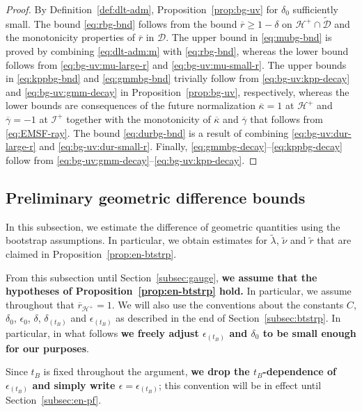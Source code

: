 \documentclass[10pt, reqno]{amsart}
\theoremstyle{definition}
\theoremstyle{remark}
\theoremstyle{conjecture}
\numberwithin{equation}{section}
\newcommand{\0}{\emptyset}
\newcommand{\dlt}{\delta}
\newcommand{\eps}{\epsilon}
\newcommand{\lmb}{\lambda}
\newcommand{\calD}{\mathcal D}
\newcommand{\calH}{\mathcal H}
\newcommand{\calI}{\mathcal I}
\newcommand{\dur}{\nu}
\newcommand{\dvr}{\lmb}
\newcommand{\de}{\delta}
\newcommand{\EH}{\calH^{+}}
\newcommand{\NI}{\calI^{+}}						%
\newcommand{\dvrbg}{\overline{\dvr}}				%
\newcommand{\durbg}{\overline{\dur}}				%
\newcommand{\rbg}{\overline{r}}					%
\newcommand{\dvrdf}{\widetilde{\dvr}}				%
\newcommand{\durdf}{\widetilde{\dur}}				%
\newcommand{\rdf}{\widetilde{r}}					%
\begin{document}
\begin{proof}
By Definition~\ref{def:dlt-adm}, Proposition~\ref{prop:bg-uv} for $\de_0$ sufficiently small. The bound \eqref{eq:rbg-bnd} follows from the bound $\rbg \geq 1-\dlt$ on $\EH \cap \widetilde{\calD}$ and the monotonicity properties of $\rbg$ in $\calD$. The upper bound in \eqref{eq:mubg-bnd} is proved by combining \eqref{eq:dlt-adm:m} with \eqref{eq:rbg-bnd}, whereas the lower bound follows from \eqref{eq:bg-uv:mu-large-r} and \eqref{eq:bg-uv:mu-small-r}. The upper bounds in \eqref{eq:kppbg-bnd} and \eqref{eq:gmmbg-bnd} trivially follow from \eqref{eq:bg-uv:kpp-decay} and \eqref{eq:bg-uv:gmm-decay} in Proposition~\ref{prop:bg-uv}, respectively, whereas the lower bounds are consequences of the future normalization $\overline{\kappa}=1$ at $\EH$ and $\overline{\gamma}=-1$ at $\NI$ together with the monotonicity of $\overline{\kappa}$ and $\overline{\gamma}$ that follows from \eqref{eq:EMSF-ray}. The bound \eqref{eq:durbg-bnd} is a result of combining \eqref{eq:bg-uv:dur-large-r} and \eqref{eq:bg-uv:dur-small-r}. Finally, \eqref{eq:gmmbg-decay}--\eqref{eq:kppbg-decay}  follow from \eqref{eq:bg-uv:gmm-decay}--\eqref{eq:bg-uv:kpp-decay}. \qedhere
\end{proof}


\subsection{Preliminary geometric difference bounds} \label{subsec:geom}
In this subsection, we estimate the difference of geometric quantities using the bootstrap assumptions. In particular, we obtain estimates for $\dvrdf$, $\durdf$ and $\rdf$ that are claimed in Proposition~\ref{prop:en-btstrp}.

From this subsection until Section~\ref{subsec:gauge}, {\bf we assume that the hypotheses of Proposition~\ref{prop:en-btstrp} hold.} In particular, we assume throughout that $\rbg_{\EH}=1$. We will also use the conventions about the constants $C$, $\de_0$, $\eps_0$, $\de$, $\de_{(t_B)}$ and $\eps_{(t_B)}$ as described in the end of Section~\ref{subsec:btstrp}. In particular, in what follows {\bf we freely adjust $\eps_{(t_{B})}$ and $\dlt_{0}$ to be small enough for our purposes}.

Since $t_{B}$ is fixed throughout the argument, \textbf{we drop the $t_{B}$-dependence of $\eps_{(t_{B})}$ and simply write $\eps = \eps_{(t_{B})}$}; this convention will be in effect until Section~\ref{subsec:en-pf}.
\end{document}
